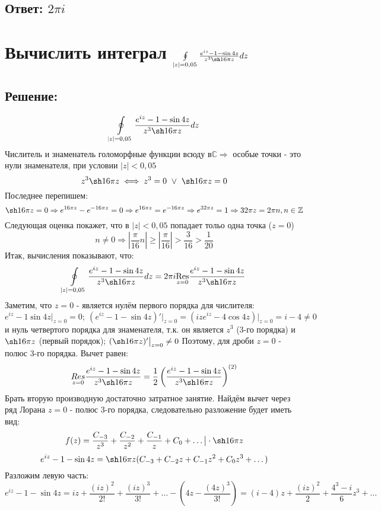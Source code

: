 \documentclass{article}
\begin{document}
	\subsection{Ответ: $2\pi i$}
	
	\section{Вычислить интеграл $\oint\limits_{|z|=0,05} \frac{e^{iz} - 1 -\sin 4z}{z^3 \sh 16 \pi z}dz$}
	\subsection{Решение:}
	\[\oint\limits_{|z|=0,05} \frac{e^{iz} - 1 -\sin 4z}{z^3 \sh 16 \pi z}dz\]
	Числитель и знаменатель голоморфные функции всюду в$\mathbb{C} \Rightarrow$ особые точки - это нули знаменателя, при условии $|z| < 0,05$
	\[z^3\sh16\pi z \iff z^3 = 0 \ \lor \ \sh 16 \pi z = 0 \]
	Последнее перепишем:
	\[\sh 16 \pi z = 0 \Rightarrow e^{16\pi z} - e^{-16\pi z} = 0 \Rightarrow e^{16\pi z} = e^{-16\pi z} \Rightarrow e^{32\pi z} = 1 \Rightarrow 32\pi z = 2\pi n, n \in \mathbb{Z}\]
	Следующая оценка покажет, что в $|z| < 0,05$ попадает тольо одна точка ($z=0$)
	\[n \ne 0 \Rightarrow \left|\frac{\pi}{16}n\right| \ge \left|\frac{\pi}{16}\right| > \frac{3}{16} > \frac{1}{20}\]
	Итак, вычисления показывают, что:
	\[\oint\limits_{|z|=0,05} \frac{e^{iz} - 1 -\sin 4z}{z^3 \sh 16 \pi z}dz = 2\pi i \underset{z=0}{\text{Res}}\frac{e^{iz} - 1 -\sin 4z}{z^3 \sh 16 \pi z}\]
	Заметим, что $z=0$ - является нулём первого порядка для числителя:
	\[e^{iz}-1\sin4z \big|_{z=0} = 0; \ (e^{iz} -1 -\sin 4z)'\big|_{z=0} = (ize^{iz} -4\cos 4z)\big|_{z=0} = i -4 \ne 0\]
	и нуль четвертого порядка для знаменателя, т.к. он является $z^3$ (3-го порядка) и $\sh16\pi z$ (первый порядок); $(\sh16\pi z)'\big|_{z=0} \ne 0$\newline
	Поэтому, для дроби $z=0$ - полюс 3-го порядка. \newline Вычет равен:
	\[\underset{z=0}{Res}\frac{e^{iz} - 1 -\sin 4z}{z^3 \sh 16 \pi z} = \frac{1}{2}\left(\frac{e^{iz} - 1 -\sin 4z}{z^3 \sh 16 \pi z}\right)^{(2)}\]
	Брать вторую производную достаточно затратное занятие. Найдём вычет через ряд Лорана
	$z=0$ - полюс 3-го порядка, следовательно разложение будет иметь вид:
	\[f(z) = \frac{C_{-3}}{z^3} + \frac{C_{-2}}{z^2} + \frac{C_{-1}}{z} + C_0 + \dots \big| \cdot \sh16\pi z\]
	\[e^{iz} -1 -\sin4z = \sh 16 \pi z (C_{-3} + C_{-2}z + C_{-1}z^2 + C_{0}z^3 + \dots)\]
	Разложим левую часть:
	\[e^{iz} -1 -\sin4z = iz + \frac{(iz)^2}{2!} + \frac{(iz)^3}{3!} + \dots - (4z - \frac{(4z)^3}{3!}) = (i-4)z + \frac{(iz)^2}{2} + \frac{4^3 - i}{6}z^3 + \dots\]
\end{document}
